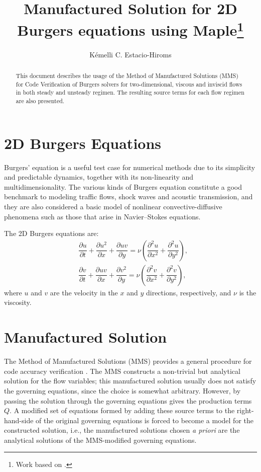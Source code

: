 \documentclass[10pt]{article}
\title{Manufactured Solution for 2D Burgers equations using Maple\footnote{Work based on \citet*{Salari_Knupp_2000}.}}
\author{Kémelli C. Estacio-Hiroms}
\newcommand{\diff}[2] {\dfrac{\partial #1}{\partial #2}}
\begin{document}
\maketitle

\begin{abstract}
This document describes the usage of the Method of Manufactured Solutions (MMS) for Code Verification of Burgers solvers for two-dimensional, viscous and inviscid flows in both steady and unsteady regimen. The resulting source terms for each flow regimen are also presented.
\end{abstract}


\section{2D Burgers Equations}

Burgers' equation is a useful test case for numerical methods due to its simplicity and predictable dynamics, together with its non-linearity and multidimensionality. The various kinds of Burgers equation constitute a good benchmark to modeling traffic flows, shock waves and acoustic transmission, and they are also considered a basic model of nonlinear convective-diffusive phenomena such as those that arise
in Navier–Stokes equations.


The 2D Burgers  equations are:
\begin{equation}
 \label{eq:burgers2d_01}
\begin{split}
&\diff{ u}{t} + \diff{ u^2 }{x}+\diff{uv}{y}=\nu \left( \diff{^2u}{ x^2}+ \diff{^2u }{y^2}\right),\\
& \diff{ v}{t}+ \diff{ u v}{x} + \diff{  v^2 }{y}=\nu \left( \diff{^2v}{ x^2}+ \diff{^2v }{y^2}\right),
\end{split}
\end{equation}
%
where $u$ and $v$ are the velocity in the  $x$ and $y$  directions, respectively, and $\nu$ is the viscosity.

\section{Manufactured Solution}
The Method of Manufactured Solutions (MMS) provides a general procedure for  code accuracy verification \citep{Roache2002,Bond2007}.
The MMS constructs a non-trivial but analytical solution for the flow variables; this manufactured
solution usually does not  satisfy the governing equations, since the choice is somewhat arbitrary. However, by passing the solution through the governing equations gives the production terms $Q$. A modified set of equations formed by adding these source terms to the right-hand-side of the original governing equations is forced to become a model for the constructed solution, i.e., the manufactured solutions chosen \textit{a priori} are the analytical solutions of the MMS-modified governing equations.
\end{document}
